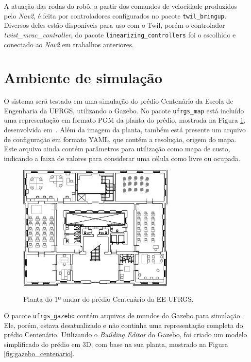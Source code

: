 \documentclass[repeatfields,xlists,xpacks,oneside,yearsonly]{ufrgscca}
\begin{document}
A atuação das rodas do robô, a partir dos comandos de velocidade
produzidos pelo \textit{Nav2}, é feita por controladores configurados
no pacote \texttt{twil\_bringup}. Diversos deles estão disponíveis
para uso com o Twil, porém o controlador
\textit{twist\_mrac\_controller}, do pacote
\texttt{linearizing\_controllers} foi o escolhido e conectado ao
\textit{Nav2} em trabalhos anteriores.

\section{Ambiente de simulação}

O sistema será testado em uma simulação do prédio Centenário da
Escola de Engenharia da UFRGS, utilizando o Gazebo. No pacote
\texttt{ufrgs\_map} está incluído uma representação em formato PGM da
planta do prédio, mostrada na Figura \ref{fig:planta_centenario},
desenvolvida em~\textcite{petry_tcc}. Além da imagem da planta,
também está presente um arquivo de configuração em formato YAML, que
contém a resolução, origem do mapa. Este arquivo ainda contém
parâmetros para utilização como mapa de custo, indicando a faixa de
valores para considerar uma célula como livre ou ocupada.

\begin{figure}[h]
    {
        \centering
        \caption{Planta do 1º andar do prédio Centenário da EE-UFRGS.}
        \label{fig:planta_centenario}
        \includegraphics[width=0.7\textwidth]{centenario_floor_plan.png}\\
    }
    {}
\end{figure}

O pacote \texttt{ufrgs\_gazebo} contém arquivos de mundos do Gazebo
para simulação. Ele, porém, estava desatualizado e não continha uma
representação completa do prédio Centenário. Utilizando o
\textit{Building Editor} do Gazebo, foi criado um modelo simplificado
do prédio em 3D, com base na sua planta, mostrado na Figura
\ref{fig:gazebo_centenario}.
\end{document}
